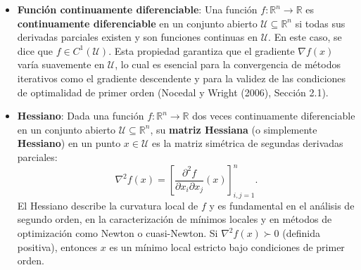\documentclass[
  spanish,
  us-letterpaper,
]{scrreprt}
\providecommand{\tightlist}{%
  \setlength{\itemsep}{0pt}\setlength{\parskip}{0pt}}
\numberwithin{equation}{section}
\begin{document}
\begin{itemize}
\tightlist
\item
  \textbf{Función continuamente diferenciable}: Una función
  \(f: \mathbb{R}^n \to \mathbb{R}\) es \textbf{continuamente
  diferenciable} en un conjunto abierto
  \(\mathcal{U} \subseteq \mathbb{R}^n\) si todas sus derivadas
  parciales existen y son funciones continuas en \(\mathcal{U}\). En
  este caso, se dice que \(f \in C^1(\mathcal{U})\). Esta propiedad
  garantiza que el gradiente \(\nabla f(x)\) varía suavemente en
  \(\mathcal{U}\), lo cual es esencial para la convergencia de métodos
  iterativos como el gradiente descendente y para la validez de las
  condiciones de optimalidad de primer orden (Nocedal y Wright (2006),
  Sección 2.1).
\item
  \textbf{Hessiano}: Dada una función \(f: \mathbb{R}^n \to \mathbb{R}\)
  dos veces continuamente diferenciable en un conjunto abierto
  \(\mathcal{U} \subseteq \mathbb{R}^n\), su \textbf{matriz Hessiana} (o
  simplemente \textbf{Hessiano}) en un punto \(x \in \mathcal{U}\) es la
  matriz simétrica de segundas derivadas parciales: \[
  \nabla^2 f(x) = \left[ \frac{\partial^2 f}{\partial x_i \partial x_j}(x) \right]_{i,j=1}^n.
  \] El Hessiano describe la curvatura local de \(f\) y es fundamental
  en el análisis de segundo orden, en la caracterización de mínimos
  locales y en métodos de optimización como Newton o cuasi-Newton. Si
  \(\nabla^2 f(x) \succ 0\) (definida positiva), entonces \(x\) es un
  mínimo local estricto bajo condiciones de primer orden.


\end{itemize}
\end{document}
